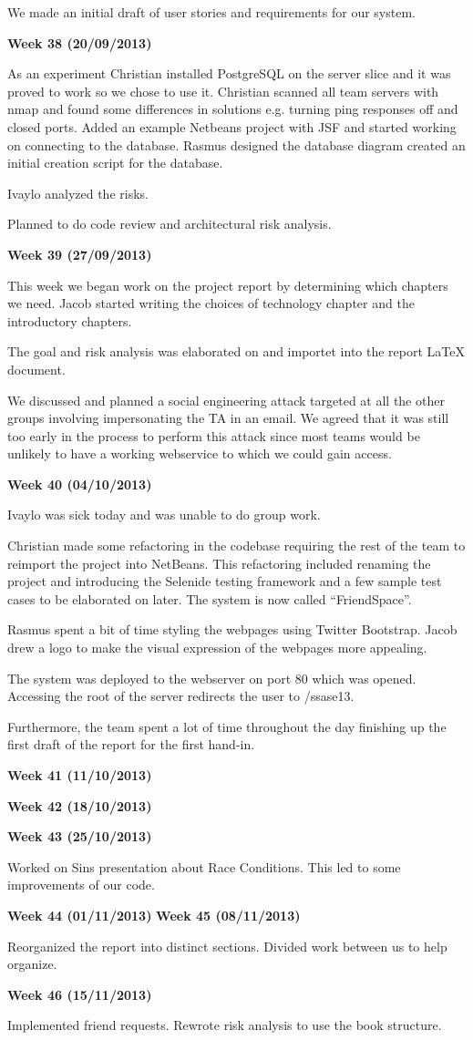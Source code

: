 We made an initial draft of user stories and requirements for our system.


\textbf{Week 38 (20/09/2013)}

As an experiment Christian installed PostgreSQL on the server slice and it was proved to work so we chose to use it. 
Christian scanned all team servers with nmap and found some differences in solutions e.g. turning ping responses off and closed ports.
Added an example Netbeans project with JSF and started working on connecting to the database.
Rasmus designed the database diagram created an initial creation script for the database.

Ivaylo analyzed the risks.

Planned to do code review and architectural risk analysis.


\textbf{Week 39 (27/09/2013)}

This week we began work on the project report by determining which chapters we need. Jacob started writing the choices of technology chapter and the introductory chapters.

The goal and risk analysis was elaborated on and importet into the report LaTeX document.

We discussed and planned a social engineering attack targeted at all the other groups involving impersonating the TA in an email. We agreed that it was still too early in the process to perform this attack since most teams would be unlikely to have a working webservice to which we could gain access.

\textbf{Week 40 (04/10/2013)}

Ivaylo was sick today and was unable to do group work.

Christian made some refactoring in the codebase requiring the rest of the team to reimport the project into NetBeans.
This refactoring included renaming the project and introducing the Selenide testing framework and a few sample test cases to be elaborated on later. The system is now called ``FriendSpace''.

Rasmus spent a bit of time styling the webpages using Twitter Bootstrap. Jacob drew a logo to make the visual expression of the webpages more appealing.

The system was deployed to the webserver on port 80 which was opened. Accessing the root of the server redirects the user to /ssase13.

Furthermore, the team spent a lot of time throughout the day finishing up the first draft of the report for the first hand-in.


\textbf{Week 41 (11/10/2013)}


\textbf{Week 42 (18/10/2013)}


\textbf{Week 43 (25/10/2013)}

Worked on Sins presentation about Race Conditions. This led to some improvements of our code.

\textbf{Week 44 (01/11/2013)}
\textbf{Week 45 (08/11/2013)}

Reorganized the report into distinct sections.
Divided work between us to help organize.

\textbf{Week 46 (15/11/2013)}

Implemented friend requests.
Rewrote risk analysis to use the book structure.